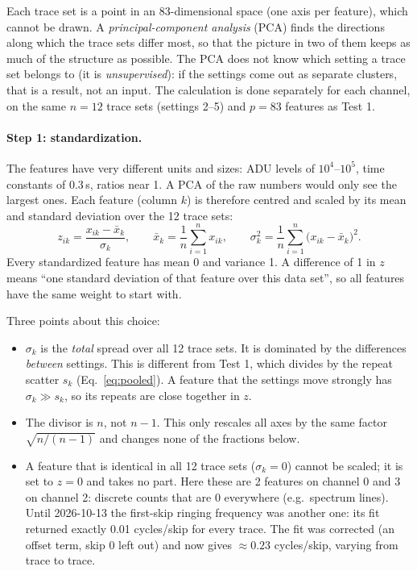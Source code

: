\documentclass[10pt]{article}
\begin{document}
Each trace set is a point in an 83-dimensional space (one axis per feature), which cannot be drawn. A
\emph{principal-component analysis} (PCA) finds the directions along which the trace sets differ most, so that the
picture in two of them keeps as much of the structure as possible. The PCA does not know which setting a trace set belongs
to (it is \emph{unsupervised}): if the settings come out as separate clusters, that is a result, not an input. The
calculation is done separately for each channel, on the same $n = 12$ trace sets (settings 2--5) and $p = 83$ features as
Test 1.

\paragraph{Step 1: standardization.} The features have very different units and sizes: ADU levels of $10^4$--$10^5$, time
constants of 0.3\,\textmu s, ratios near 1. A PCA of the raw numbers would only see the largest ones. Each feature (column
$k$) is therefore centred and scaled by its mean and standard deviation over the 12 trace sets:
\begin{equation}
z_{ik} = \frac{x_{ik} - \bar x_k}{\sigma_k}, \qquad
\bar x_k = \frac1n\sum_{i=1}^{n} x_{ik}, \qquad
\sigma_k^2 = \frac1n\sum_{i=1}^{n}\bigl(x_{ik} - \bar x_k\bigr)^2 .
\label{eq:standardize}
\end{equation}
Every standardized feature has mean 0 and variance 1. A difference of 1 in $z$ means ``one standard deviation of that
feature over this data set'', so all features have the same weight to start with.

Three points about this choice:
\begin{itemize}
\item $\sigma_k$ is the \emph{total} spread over all 12 trace sets. It is dominated by the differences \emph{between}
  settings. This is different from Test 1, which divides by the repeat scatter $s_k$ (Eq.~\ref{eq:pooled}). A feature
  that the settings move strongly has $\sigma_k \gg s_k$, so its repeats are close together in $z$.
\item The divisor is $n$, not $n-1$. This only rescales all axes by the same factor $\sqrt{n/(n-1)}$ and changes none of
  the fractions below.
\item A feature that is identical in all 12 trace sets ($\sigma_k = 0$) cannot be scaled; it is set to $z = 0$ and takes no
  part. Here these are 2 features on channel 0 and 3 on channel 2: discrete counts that are 0 everywhere (e.g.\ spectrum
  lines). Until 2026-10-13 the first-skip ringing frequency was another one: its fit returned exactly 0.01 cycles/skip
  for every trace. The fit was corrected (an offset term, skip 0 left out) and now gives $\approx 0.23$ cycles/skip,
  varying from trace to trace.
\end{itemize}
\end{document}
